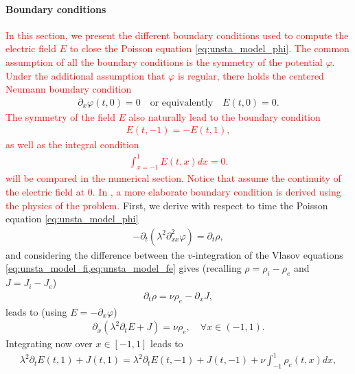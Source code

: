 \documentclass{article}
\numberwithin{equation}{section}
\begin{document}
 \paragraph{Boundary conditions}
 
 \textcolor{red}{In this section, we present the different boundary conditions used to compute the electric field $E$ to close the Poisson equation \cref{eq:unsta_model_phi}. The common assumption of all the boundary conditions is the symmetry of the potential $\varphi$. Under the additional assumption that $\varphi$ is regular, there holds the centered Neumann boundary condition}
 \begin{align}\label{eq:phi_bc_neumann}
 	\partial_x \varphi (t,0) = 0 \quad \text{or equivalently} \quad E(t,0) = 0.
 \end{align}
 \textcolor{red}{
 The symmetry of the field $E$ also naturally lead to the boundary condition 
 \begin{align}\label{eq:phi_bc_dirich}
 	E(t,-1) = - E(t,1),
 \end{align}
 as well as the integral condition
 \begin{align}
 \label{eq:phi_bc_integ}
 	\int_{x=-1}^1 E(t,x) dx = 0.
 \end{align}
  will be compared in the numerical section. Notice that  assume the continuity of the electric field at 0. In \cite{manfredi_devaux}, a more elaborate boundary condition is derived using the physics of the problem. 
 }
First, we derive with respect to time the Poisson equation \cref{eq:unsta_model_phi}
\begin{align*}
	- \partial_t (\lambda^2\partial_{xx}^2 \varphi) = \partial_t \rho, 	
\end{align*}
and considering the difference between the $v$-integration of the Vlasov equations \cref{eq:unsta_model_fi,eq:unsta_model_fe} gives (recalling $\rho=\rho_i-\rho_e$ and $J=J_i-J_e$) 
\begin{align*}
	\partial_t \rho = \nu \rho_e - \partial_x J,
\end{align*}
leads to (using $E=-\partial_x \varphi$) 
\begin{align*}
	\partial_x (\lambda^2\partial_t E + J) = \nu \rho_e, \quad \forall x\in (-1, 1). 	
\end{align*}
Integrating now over $x\in[-1, 1]$ leads to 
\begin{align}\label{eq:ampere_integ}
	\lambda^2\partial_t E(t, 1) + J(t, 1) = \lambda^2\partial_t E(t, -1) + J(t, -1) +\nu \int_{-1}^1 \rho_e (t, x) dx,  
\end{align}
\end{document}
